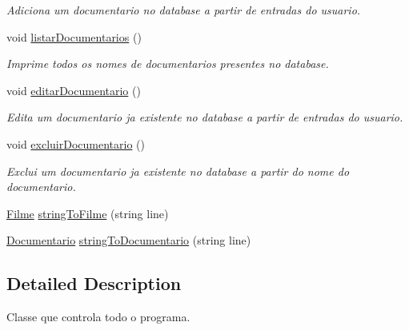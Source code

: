 \begin{DoxyCompactItemize}
\begin{DoxyCompactList}\small\item\em Adiciona um documentario no database a partir de entradas do usuario. \end{DoxyCompactList}\item 
void \hyperlink{classController_a70aa8461ae785c75ae6f4cda12be73fd}{listar\+Documentarios} ()\hypertarget{classController_a70aa8461ae785c75ae6f4cda12be73fd}{}\label{classController_a70aa8461ae785c75ae6f4cda12be73fd}

\begin{DoxyCompactList}\small\item\em Imprime todos os nomes de documentarios presentes no database. \end{DoxyCompactList}\item 
void \hyperlink{classController_a8e3af17b91fb97c424f71763a52efc7c}{editar\+Documentario} ()\hypertarget{classController_a8e3af17b91fb97c424f71763a52efc7c}{}\label{classController_a8e3af17b91fb97c424f71763a52efc7c}

\begin{DoxyCompactList}\small\item\em Edita um documentario ja existente no database a partir de entradas do usuario. \end{DoxyCompactList}\item 
void \hyperlink{classController_add9e27a70f03537309a7baed09bd94fd}{excluir\+Documentario} ()\hypertarget{classController_add9e27a70f03537309a7baed09bd94fd}{}\label{classController_add9e27a70f03537309a7baed09bd94fd}

\begin{DoxyCompactList}\small\item\em Exclui um documentario ja existente no database a partir do nome do documentario. \end{DoxyCompactList}\item 
\hyperlink{classFilme}{Filme} \hyperlink{classController_aafde6d0c728bb9d12250e3d7da8f9706}{string\+To\+Filme} (string line)
\item 
\hyperlink{classDocumentario}{Documentario} \hyperlink{classController_a159cba9377da81c1c235aafa16c4ca1a}{string\+To\+Documentario} (string line)
\end{DoxyCompactItemize}


\subsection{Detailed Description}
Classe que controla todo o programa. 

